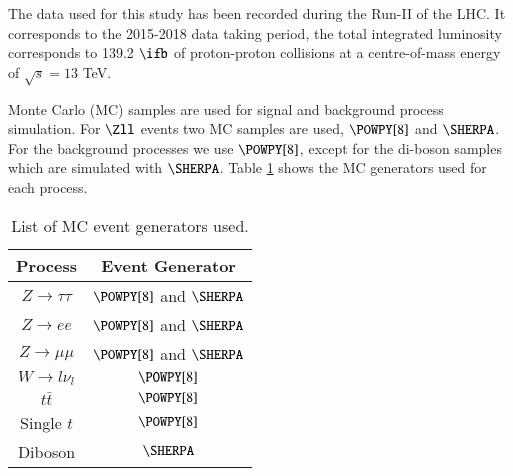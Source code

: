 The data used for this study has been recorded during the Run-II of the LHC. It corresponds to the 2015-2018 data taking period, the total integrated luminosity corresponds to 139.2 $\ifb	$ of proton-proton collisions at a centre-of-mass energy of $\sqrt{s}=13$ TeV.

Monte Carlo (MC) samples are used for signal and background process simulation. For $\Zll$ events two MC samples are used, $\POWPY[8]$ and $\SHERPA$. For the background processes we use $\POWPY[8]$, except for the di-boson samples which are simulated with $\SHERPA$. Table \ref{Table3} shows the MC generators used for each process.

\begin{table}[htbp]
	\centering
	\begin{tabular}{cc}
		\hline
		\multicolumn{1}{|c|}{Process}  & \multicolumn{1}{c|}{Event Generator} \\ \hline
		$Z\to\tau\tau$                 & $\POWPY[8]$ and $\SHERPA$           \\
		$Z\to ee$                      & $\POWPY[8]$ and $\SHERPA$           \\
		$Z\to\mu\mu$                   & $\POWPY[8]$ and $\SHERPA$           \\
		$W\to l\nu_l$				   & $\POWPY[8]$                       \\
		$t\bar{t}$                     & $\POWPY[8]$                       \\
		Single $t$                     & $\POWPY[8]$                       \\
		Diboson                        & $\SHERPA$                       \\ \hline
	\end{tabular}
	\caption{List of MC event generators used.}
	\label{Table3}
\end{table}